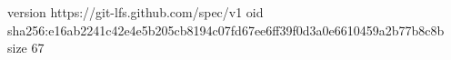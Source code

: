 version https://git-lfs.github.com/spec/v1
oid sha256:e16ab2241c42e4e5b205cb8194c07fd67ee6ff39f0d3a0e6610459a2b77b8c8b
size 67
